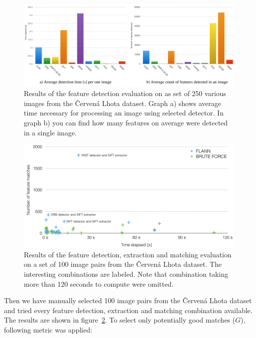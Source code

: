 \begin{figure}[!htbp]
	\begin{center}
		\includegraphics[keepaspectratio,width=\textwidth]{fig/detectors.pdf}
	\end{center}
	\caption{Results of the feature detection evaluation on as set of 250 various images from the Červená Lhota dataset. Graph a) shows average time necessary for processing an image using selected detector. In graph b) you can find how many features on average were detected in a single image.}
	\label{fig:detectors}
\end{figure}

\begin{figure}[!htbp]
	\begin{center}
		\includegraphics[keepaspectratio,width=\textwidth]{fig/matchers.pdf}
	\end{center}
	\caption{Results of the feature detection, extraction and matching evaluation on a set of 100 image pairs from the Červená Lhota dataset. The interesting combinations are labeled. Note that combination taking more than 120 seconds to compute were omitted.}
	\label{fig:matchers}
\end{figure}

Then we have manually selected 100 image pairs from the Červená Lhota dataset and tried every feature detection, extraction and matching combination available. The results are shown in figure~\ref{fig:matchers}. To select only potentially good matches ($G$), following metric was applied:

